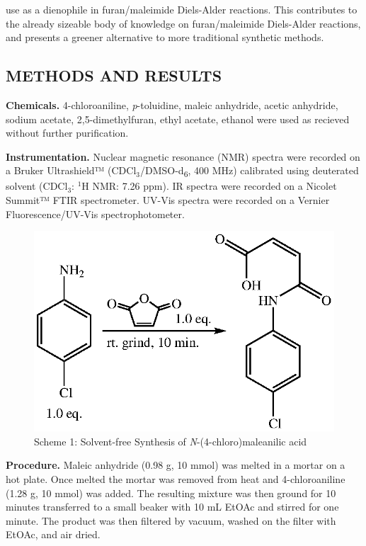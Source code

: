 \documentclass[11pt]{article}
\let\bf\textbf
\begin{document}
use as a dienophile in furan/maleimide Diels-Alder reactions. This contributes to the already sizeable body of knowledge on furan/maleimide Diels-Alder reactions, and presents a greener alternative to more traditional synthetic methods. 

\subsection*{METHODS AND RESULTS}
\bf{Chemicals.} 4-chloroaniline, \textit{p}-toluidine, maleic anhydride, acetic anhydride, sodium acetate, 2,5-dimethylfuran, ethyl acetate, ethanol were used as recieved without further purification.

\bf{Instrumentation.} Nuclear magnetic resonance (NMR) spectra were recorded on a Bruker Ultrashield™ (CDCl$_3$/DMSO-d\textsubscript{6}, 400 MHz) calibrated using deuterated solvent (CDCl$_3$: $^1$H NMR: 7.26 ppm). IR spectra were recorded on a Nicolet Summit™ FTIR spectrometer. UV-Vis spectra were recorded on a Vernier Fluorescence/UV-Vis spectrophotometer.

\begin{figure}[H]
    \centering
    \includegraphics[scale=0.8]{schemes/scheme1.eps}
    \caption*{Scheme 1: Solvent-free Synthesis of \textit{N}-(4-chloro)maleanilic acid}
\end{figure}

\bf{Procedure.} Maleic anhydride (0.98 g, 10 mmol) was melted in a mortar on a hot plate. Once melted the mortar was removed from heat and 4-chloroaniline (1.28 g, 10 mmol) was added. The resulting mixture was then ground for 10 minutes transferred to a small beaker with 10 mL EtOAc and stirred for one minute. The product was then filtered by vacuum, washed on the filter with EtOAc, and air dried.
\end{document}
